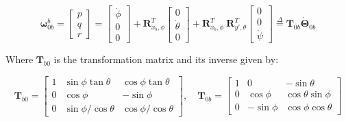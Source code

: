 \documentclass{article}
\begin{document}
\begin{equation}
\mathbf{\omega}_{0b}^b =
\begin{bmatrix}
p \\
q  \\
r
\end{bmatrix}
=
\begin{bmatrix}
\dot{\phi} \\
0  \\
0
\end{bmatrix}
+ \textbf{R}_{x_b,\phi}^T
\begin{bmatrix}
0 \\
\dot{\theta}  \\
0
\end{bmatrix}
+ \textbf{R}_{x_b,\phi}^T \:\textbf{R}_{y',\theta}^T
\begin{bmatrix}
0 \\
0  \\
\dot{\psi}
\end{bmatrix}
\stackrel{\Delta}{=}
\textbf{T}_{0b} \dot{\mathbf{\Theta}}_{0b}
\end{equation}

Where $\mathbf{T}_{b0}$ is the transformation matrix and its inverse given by:

\begin{equation}
\textbf{T}_{b0} =
\begin{bmatrix}
1 & \sin \phi \tan \theta & \cos \phi \tan \theta \\
0 & \cos \phi & -\sin \phi  \\
0 & \sin \phi / \cos \theta & \cos \phi / \cos \theta
\end{bmatrix}, 
\quad
\textbf{T}_{0b} =
\begin{bmatrix}
1 & 0 & - \sin \theta \\
0 & \cos \phi & \cos \theta \sin \phi  \\
0 & -\sin \phi & \cos \phi \cos \theta
\end{bmatrix}
\end{equation}
\end{document}
